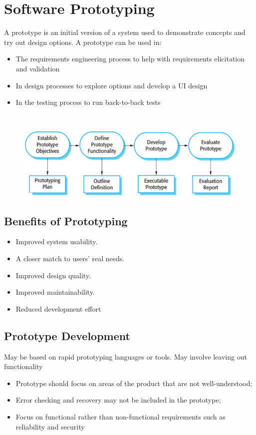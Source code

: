 \documentclass{report}
\begin{document}
\newpage
\section{Software Prototyping}
\vspace{-1em}
\begin{multicols}{2}
\noindent A prototype is an initial version of a system used to demonstrate concepts and try out design options. A prototype can be used in:
\begin{itemize}
  \item The requirements engineering process to help with requirements elicitation and validation
  \item In design processes to explore options and develop a UI design
  \item In the testing process to run back-to-back tests
\end{itemize} \ \newline
\begin{figure}[H]
\centering
\includegraphics[scale=.35,trim=1cm 1cm 1cm 1cm]{assets/CEN4010_Prototype_Development.jpg}
\end{figure}
\vfill\columnbreak
\end{multicols}

\subsection{Benefits of Prototyping}
\begin{itemize}
  \item Improved system usability.
  \item A closer match to users' real needs.
  \item Improved design quality.
  \item Improved maintainability.
  \item Reduced development effort
\end{itemize}

\subsection{Prototype Development}
\noindent May be based on rapid prototyping languages or tools. May involve leaving out functionality
\begin{itemize}
  \item Prototype should focus on areas of the product that are not well-understood;
  \item Error checking and recovery may not be included in the prototype;
  \item Focus on functional rather than non-functional requirements such as reliability and security
\end{itemize}
\end{document}
